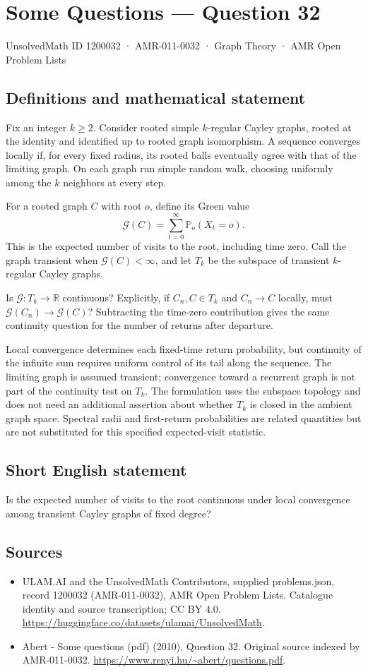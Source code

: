\documentclass[11pt,a4paper]{article}
\begin{document}
\section*{Some Questions — Question 32}\label{1200032}
{\small UnsolvedMath ID 1200032 · AMR-011-0032 · Graph Theory · AMR Open Problem Lists}
\subsection{Definitions and mathematical statement}
Fix an integer $k\geq2$. Consider rooted simple $k$-regular Cayley graphs, rooted at the identity and identified up to rooted graph isomorphism. A sequence converges locally if, for every fixed radius, its rooted balls eventually agree with that of the limiting graph. On each graph run simple random walk, choosing uniformly among the $k$ neighbors at every step.

For a rooted graph $C$ with root $o$, define its Green value
\[
 \mathcal G(C)=\sum_{t=0}^{\infty}\mathbb P_o(X_t=o).
\]
This is the expected number of visits to the root, including time zero. Call the graph transient when $\mathcal G(C)<\infty$, and let $T_k$ be the subspace of transient $k$-regular Cayley graphs.

Is $\mathcal G:T_k\to\mathbb R$ continuous? Explicitly, if $C_n,C\in T_k$ and $C_n\to C$ locally, must $\mathcal G(C_n)\to\mathcal G(C)$? Subtracting the time-zero contribution gives the same continuity question for the number of returns after departure.

Local convergence determines each fixed-time return probability, but continuity of the infinite sum requires uniform control of its tail along the sequence. The limiting graph is assumed transient; convergence toward a recurrent graph is not part of the continuity test on $T_k$. The formulation uses the subspace topology and does not need an additional assertion about whether $T_k$ is closed in the ambient graph space. Spectral radii and first-return probabilities are related quantities but are not substituted for this specified expected-visit statistic.
\subsection{Short English statement}
Is the expected number of visits to the root continuous under local convergence among transient Cayley graphs of fixed degree?
\subsection{Sources}
\begin{itemize}
\item[S1] ULAM.AI and the UnsolvedMath Contributors, supplied problems.json, record 1200032 (AMR-011-0032), AMR Open Problem Lists. Catalogue identity and source transcription; CC BY 4.0.
\url{https://huggingface.co/datasets/ulamai/UnsolvedMath}.
\item[S2] Abert - Some questions (pdf) (2010), Question 32. Original source indexed by AMR-011-0032.
\url{https://www.renyi.hu/~abert/questions.pdf}.
\end{itemize}
\end{document}
